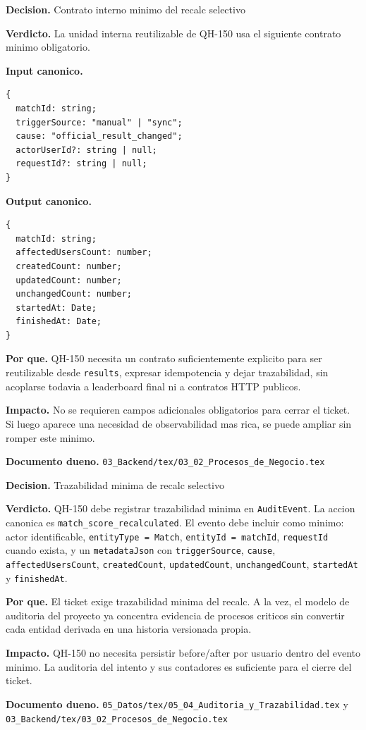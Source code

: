 \begin{docnote}
\textbf{Decision.} Contrato interno minimo del recalc selectivo

\textbf{Verdicto.} La unidad interna reutilizable de QH-150 usa el siguiente contrato minimo obligatorio.

\textbf{Input canonico.}
\begin{verbatim}
{
  matchId: string;
  triggerSource: "manual" | "sync";
  cause: "official_result_changed";
  actorUserId?: string | null;
  requestId?: string | null;
}
\end{verbatim}

\textbf{Output canonico.}
\begin{verbatim}
{
  matchId: string;
  affectedUsersCount: number;
  createdCount: number;
  updatedCount: number;
  unchangedCount: number;
  startedAt: Date;
  finishedAt: Date;
}
\end{verbatim}

\textbf{Por que.} QH-150 necesita un contrato suficientemente explicito para ser reutilizable desde \texttt{results}, expresar idempotencia y dejar trazabilidad, sin acoplarse todavia a leaderboard final ni a contratos HTTP publicos.

\textbf{Impacto.} No se requieren campos adicionales obligatorios para cerrar el ticket. Si luego aparece una necesidad de observabilidad mas rica, se puede ampliar sin romper este minimo.

\textbf{Documento dueno.} \texttt{03\_Backend/tex/03\_02\_Procesos\_de\_Negocio.tex}
\end{docnote}

\begin{docnote}
\textbf{Decision.} Trazabilidad minima de recalc selectivo

\textbf{Verdicto.} QH-150 debe registrar trazabilidad minima en \texttt{AuditEvent}. La accion canonica es \texttt{match\_score\_recalculated}. El evento debe incluir como minimo: actor identificable, \texttt{entityType = Match}, \texttt{entityId = matchId}, \texttt{requestId} cuando exista, y un \texttt{metadataJson} con \texttt{triggerSource}, \texttt{cause}, \texttt{affectedUsersCount}, \texttt{createdCount}, \texttt{updatedCount}, \texttt{unchangedCount}, \texttt{startedAt} y \texttt{finishedAt}.

\textbf{Por que.} El ticket exige trazabilidad minima del recalc. A la vez, el modelo de auditoria del proyecto ya concentra evidencia de procesos criticos sin convertir cada entidad derivada en una historia versionada propia.

\textbf{Impacto.} QH-150 no necesita persistir before/after por usuario dentro del evento minimo. La auditoria del intento y sus contadores es suficiente para el cierre del ticket.

\textbf{Documento dueno.} \texttt{05\_Datos/tex/05\_04\_Auditoria\_y\_Trazabilidad.tex} y \texttt{03\_Backend/tex/03\_02\_Procesos\_de\_Negocio.tex}
\end{docnote}

